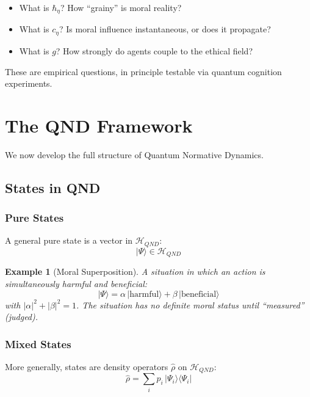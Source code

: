 \documentclass[12pt]{article}
\newtheorem{example}{Example}[section]
\begin{document}
\begin{itemize}
    \item What is $\hbar_\eta$? How ``grainy'' is moral reality?
    \item What is $c_\eta$? Is moral influence instantaneous, or does it propagate?
    \item What is $g$? How strongly do agents couple to the ethical field?
\end{itemize}

These are empirical questions, in principle testable via quantum cognition experiments.

\section{The QND Framework}

We now develop the full structure of Quantum Normative Dynamics.

\subsection{States in QND}

\subsubsection{Pure States}

A general pure state is a vector in $\mathcal{H}_{QND}$:
\begin{equation}
    |\Psi\rangle \in \mathcal{H}_{QND}
\end{equation}

\begin{example}[Moral Superposition]
A situation in which an action is simultaneously harmful and beneficial:
\begin{equation}
    |\Psi\rangle = \alpha \,|\text{harmful}\rangle + \beta \,|\text{beneficial}\rangle
\end{equation}
with $|\alpha|^2 + |\beta|^2 = 1$. The situation has no definite moral status until ``measured'' (judged).
\end{example}

\subsubsection{Mixed States}

More generally, states are density operators $\hat{\rho}$ on $\mathcal{H}_{QND}$:
\begin{equation}
    \hat{\rho} = \sum_i p_i \,|\Psi_i\rangle \langle \Psi_i|
\end{equation}
\end{document}
